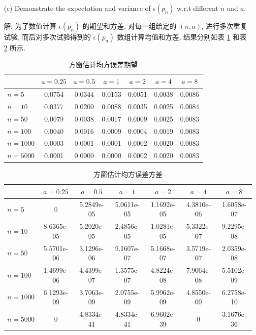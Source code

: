 \documentclass{article}
\begin{document}
(c) Demonstrate the expectation and variance of $\epsilon(p_n)$ w.r.t different $n$ and $a$.

解: 为了数值计算 $\epsilon(p_n)$ 的期望和方差, 对每一组给定的 $(n,a)$, 进行多次重复试验, 而后对多次试验得到的 $\epsilon(p_n)$ 数组计算均值和方差, 结果分别如表 \ref{tab:squMeanMSE} 和表 \ref{tab:squVarMSE} 所示.

\begin{table}[htbp]
  \centering
  \begin{tabular}{l|cccccc}
  \hline
           & $a=0.25$ & $a=0.5$ & $a=1$  & $a=2$  & $a=4$  & $a=8$  \\ 
  \hline
  $n=5$    & 0.0754   & 0.0344  & 0.0153 & 0.0051 & 0.0038 & 0.0086 \\
  $n=10$   & 0.0377   & 0.0200  & 0.0088 & 0.0035 & 0.0025 & 0.0084 \\
  $n=50$   & 0.0079   & 0.0038  & 0.0017 & 0.0009 & 0.0025 & 0.0083 \\
  $n=100$  & 0.0040   & 0.0016  & 0.0009 & 0.0004 & 0.0019 & 0.0083 \\
  $n=1000$ & 0.0003   & 0.0001  & 0.0001 & 0.0002 & 0.0020 & 0.0083 \\
  $n=5000$ & 0.0001   & 0.0000  & 0.0000 & 0.0002 & 0.0020 & 0.0083 \\ 
  \hline
  \end{tabular}
  \caption{方窗估计均方误差期望}
  \label{tab:squMeanMSE}
\end{table}

\begin{table}[htbp]
  \centering
  \begin{tabular}{l|cccccc}
  \hline
           & $a=0.25$   & $a=0.5$    & $a=1$      & $a=2$      & $a=4$      & $a=8$      \\ \hline
  $n=5$    & 0          & 5.2849e-05 & 5.0611e-05 & 1.1692e-05 & 4.3810e-06 & 1.6058e-07 \\
  $n=10$   & 8.6365e-05 & 5.2020e-05 & 2.4856e-05 & 1.0281e-05 & 5.3322e-07 & 9.2295e-08 \\
  $n=50$   & 5.5701e-06 & 3.1296e-06 & 9.1607e-07 & 5.1668e-07 & 3.5719e-07 & 2.0359e-08 \\
  $n=100$  & 1.4699e-06 & 4.4399e-07 & 1.3575e-07 & 4.8224e-08 & 7.9064e-08 & 5.5102e-09 \\
  $n=1000$ & 6.1293e-09 & 3.7063e-09 & 2.0755e-09 & 5.9962e-09 & 4.8550e-09 & 6.2758e-10 \\
  $n=5000$ & 0          & 4.8334e-41 & 4.8334e-41 & 6.9602e-39 & 0          & 3.1676e-36 \\ \hline
  \end{tabular}
  \caption{方窗估计均方误差方差}
  \label{tab:squVarMSE}
\end{table}
\end{document}
